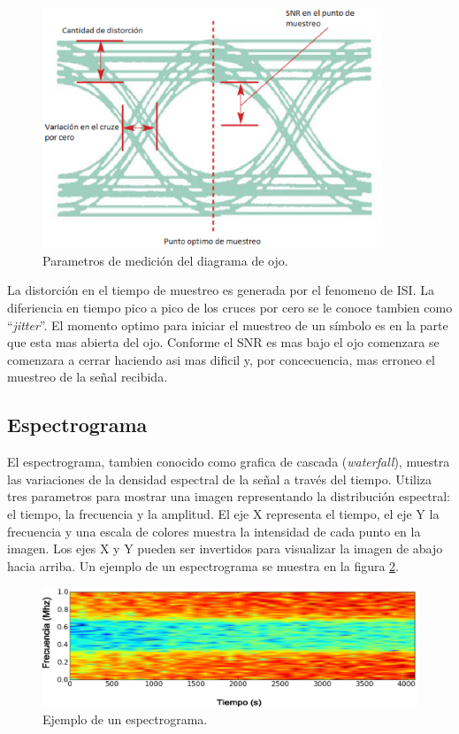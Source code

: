 \begin{figure}[htp]
\centering
	\includegraphics[width=4in]{figs/eyeparams}
	\caption{Parametros de medici\'on del diagrama de ojo.}
	\label{fig:eyeparams}
\end{figure}

La distorci\'on en el tiempo de muestreo es generada por el fenomeno de ISI. La diferiencia en
tiempo pico a pico de los cruces por cero se le conoce tambien como ``\emph{jitter}''. El momento
optimo para iniciar el muestreo de un s\'imbolo es en la parte que esta mas abierta del ojo. Conforme el
SNR es mas bajo el ojo comenzara se comenzara a cerrar haciendo asi mas dificil y, por concecuencia,
mas erroneo el muestreo de la se\~nal recibida.

\subsection{Espectrograma}
El espectrograma, tambien conocido como grafica de cascada (\emph{waterfall}), muestra las
variaciones de la densidad espectral de la se\~nal a trav\'es del tiempo. Utiliza tres parametros
para mostrar una imagen representando la distribuci\'on espectral: el tiempo, la frecuencia y la
amplitud. El eje X representa el tiempo, el eje Y la frecuencia y una escala de colores muestra la
intensidad de cada punto en la imagen. Los ejes X y Y pueden ser invertidos para visualizar la
imagen de abajo hacia arriba. Un ejemplo de un espectrograma se muestra en la figura
\ref{fig:spectrogram}.

\begin{figure}[htp]
\centering
	\includegraphics[width=5.5in]{figs/spectrogram}
	\caption{Ejemplo de un espectrograma.}
	\label{fig:spectrogram}
\end{figure}

